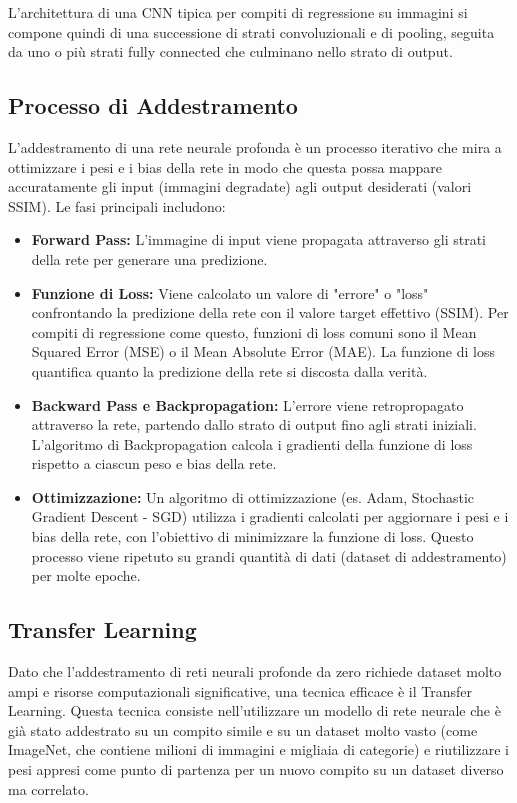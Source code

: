 L'architettura di una CNN tipica per compiti di regressione su immagini si compone quindi di una successione di strati convoluzionali e di pooling, seguita da uno o più strati fully connected che culminano nello strato di output.

\subsection{Processo di Addestramento}

L'addestramento di una rete neurale profonda è un processo iterativo che mira a ottimizzare i pesi e i bias della rete in modo che questa possa mappare accuratamente gli input (immagini degradate) agli output desiderati (valori SSIM). Le fasi principali includono:
\begin{itemize}
    \item \textbf{Forward Pass:} L'immagine di input viene propagata attraverso gli strati della rete per generare una predizione.
    \item \textbf{Funzione di Loss:} Viene calcolato un valore di "errore" o "loss" confrontando la predizione della rete con il valore target effettivo (SSIM). Per compiti di regressione come questo, funzioni di loss comuni sono il Mean Squared Error (MSE) o il Mean Absolute Error (MAE). La funzione di loss quantifica quanto la predizione della rete si discosta dalla verità.
    \item \textbf{Backward Pass e Backpropagation:} L'errore viene retropropagato attraverso la rete, partendo dallo strato di output fino agli strati iniziali. L'algoritmo di Backpropagation calcola i gradienti della funzione di loss rispetto a ciascun peso e bias della rete.
    \item \textbf{Ottimizzazione:} Un algoritmo di ottimizzazione (es. Adam, Stochastic Gradient Descent - SGD) utilizza i gradienti calcolati per aggiornare i pesi e i bias della rete, con l'obiettivo di minimizzare la funzione di loss. Questo processo viene ripetuto su grandi quantità di dati (dataset di addestramento) per molte epoche.
\end{itemize}

\subsection{Transfer Learning}

Dato che l'addestramento di reti neurali profonde da zero richiede dataset molto ampi e risorse computazionali significative, una tecnica efficace è il Transfer Learning. Questa tecnica consiste nell'utilizzare un modello di rete neurale che è già stato addestrato su un compito simile e su un dataset molto vasto (come ImageNet, che contiene milioni di immagini e migliaia di categorie) e riutilizzare i pesi appresi come punto di partenza per un nuovo compito su un dataset diverso ma correlato.


